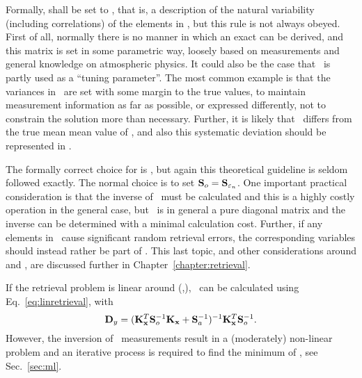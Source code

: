 Formally,  shall be set to \aCvrMtr{\SttVct} \citep{rodgers:00},
that is, a description of the natural variability (including correlations) of
the elements in \SttVct, but this rule is not always obeyed. First of all,
normally there is no manner in which an exact \aCvrMtr{\SttVct} can be derived,
and this matrix is set in some parametric way, loosely based on measurements
and general knowledge on atmospheric physics. It could also be the case that
\ is partly used as a ``tuning parameter''. The most common example
is that the variances in \ are set with some margin to the true
values, to maintain measurement information as far as possible, or expressed
differently, not to constrain the solution more than necessary. Further, it is
likely that \ differs from the true mean mean value of \SttVct, and
also this systematic deviation should be represented in 
\citep{eriksson:analy:00}.

The formally correct choice for  is 
\citep{eriksson:analy:00,rodgers:00}, but again this theoretical guideline is
seldom followed exactly. The normal choice is to set
$\mathbf{S}_{o}=\mathbf{S}_{\varepsilon_n}$. One important practical consideration is
that the inverse of \ must be calculated and this is a
highly costly operation in the general case, but \ is in
general a pure diagonal matrix and the inverse can be determined with a minimal
calculation cost. Further, if any elements in \FrwMdlVct\ cause significant
random retrieval errors, the corresponding variables should instead rather be
part of \SttVct. This last topic, and other considerations around 
and , are discussed further in Chapter~\ref{chapter:retrieval}.

If the retrieval problem is linear around (,\FrwMdlVctHat), \RtrVct\
can be calculated using Eq.~\ref{eq:linretrieval}, with
\citep[][Eq.~4.5]{rodgers:00}
\begin{equation}
  \label{eq:lindy}
  \mathbf{D}_{y} = (\mathbf{K}_{\mathbf{x}}^T\mathbf{S}_{o}^{-1}\mathbf{K}_{\mathbf{x}}
  +\mathbf{S}_{a}^{-1})^{-1}\mathbf{K}_{\mathbf{x}}^T\mathbf{S}_{o}^{-1}.
\end{equation}
However, the inversion of \smr\ measurements result in a (moderately)
non-linear problem and an iterative process is required to find the minimum of
\CstFnc, see Sec.~\ref{sec:ml}.


